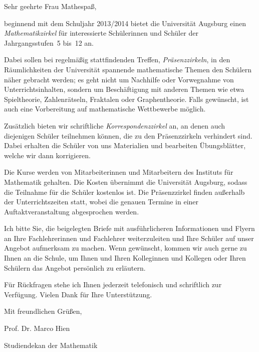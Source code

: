 \documentclass{zirkelbrief}
\begin{document}
\renewcommand{\anschrift}{%
      Holbein-Gymnasium Augsburg \\
      Fachbereich Mathematik \\
      Hallstraße 10 \\
      86150 Augsburg}
\renewcommand{\datum}{2.9.2013}
\renewcommand{\betreff}{Matheschülerzirkel der Universität Augsburg}

\makeletterhead

Sehr geehrte Frau Mathespaß,

beginnend mit dem Schuljahr 2013/2014 bietet die Universität Augsburg
einen \emph{Mathe\-matik\-zir\-kel} für interessierte Schülerinnen und Schüler der
Jahrgangsstufen~5 bis~12 an.

Dabei sollen bei regelmäßig stattfindenden Treffen, \emph{Präsenzzirkeln}, in
den Räum\-lich\-kei\-ten der Universität spannende mathematische Themen den Schülern
näher gebracht werden; es geht nicht um Nachhilfe oder Vorwegnahme von
Unterrichtsinhalten, sondern um Beschäftigung mit anderen Themen wie etwa
Spieltheorie, Zahlenrätseln, Fraktalen oder Graphentheorie. Falls gewünscht, ist
auch eine Vorbereitung auf mathematische Wettbewerbe möglich.

Zusätzlich bieten wir schriftliche \emph{Korrespondenzzirkel} an, an denen auch diejenigen Schüler teilnehmen können, die zu den Präsenzzirkeln verhindert sind. Dabei erhalten die Schüler von uns
Materialien und bearbeiten Übungsblätter, welche wir dann korrigieren.

Die Kurse werden von Mitarbeiterinnen und Mitarbeitern des
Instituts für Mathematik gehalten. Die Kosten übernimmt die Universität Augsburg, sodass
die Teilnahme für die Schüler kostenlos ist. Die Präsenzzirkel finden
außerhalb der Unterrichtszeiten statt, wobei die genauen Termine in einer
Auftaktveranstaltung abgesprochen werden.

Ich bitte Sie, die beigelegten Briefe mit ausführlicheren Informationen und Flyern an Ihre
Fachlehrerinnen und Fachlehrer weiterzuleiten und Ihre Schüler auf unser
Angebot aufmerksam zu machen. Wenn gewünscht, kommen wir auch gerne zu Ihnen an die
Schule, um Ihnen und Ihren Kolleginnen und Kollegen oder Ihren Schülern das
Angebot persönlich zu erläutern.

Für Rückfragen stehe ich Ihnen jederzeit telefonisch und schriftlich 
zur Verfügung. Vielen Dank für Ihre Unterstützung.

Mit freundlichen Grüßen,

\vspace{1cm}

Prof. Dr. Marco Hien

\vspace{-0.2cm}

{\small Studiendekan der Mathematik}
\end{document}
